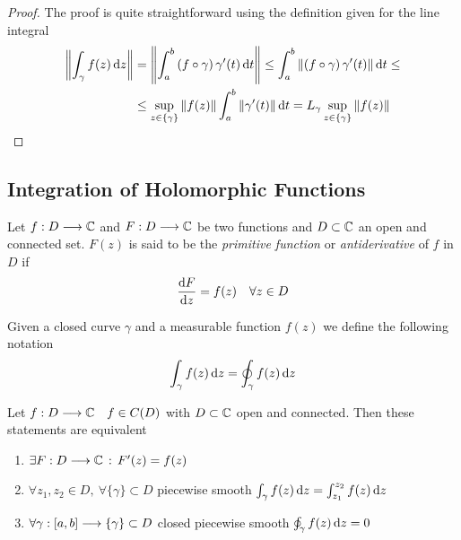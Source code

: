 \documentclass[../complete.tex]{subfiles}
\begin{document}
\begin{proof}
	The proof is quite straightforward using the definition given for the line integral
	\begin{equation*}
		\begin{aligned}
			\norm{\int_{\gamma}^{}f(z)\operatorname{d\!} z}&=\norm{\int_{a}^{b}\left( f\circ\gamma \right)\gamma'(t)\operatorname{d\!} t}\le\int_{a}^{b}\norm{\left( f\circ\gamma \right)\gamma'(t)}\operatorname{d\!} t\le\\
			&\le\sup_{z\in\{\gamma\}}\norm{f(z)}\int_{a}^{b}\norm{\gamma'(t)}\operatorname{d\!} t=L_\gamma\sup_{z\in\{\gamma\}}\norm{f(z)}
		\end{aligned}
	\end{equation*}
\end{proof}
\subsection{Integration of Holomorphic Functions}
\begin{dfn}[Primitive]
	Let $f:D\overset{}{\longrightarrow}\mathbb{C}$ and $F:D\overset{}{\longrightarrow}\mathbb{C}$ be two functions and $D\subset\mathbb{C}$ an open and connected set. $F(z)$ is said to be the \textit{primitive function} or \textit{antiderivative} of $f$ in $D$ if
	\begin{equation}
		\derivative{F}{z}=f(z)\quad\forall z\in D
		\label{eq:primitive}
	\end{equation}
\end{dfn}
\begin{ntn}
	Given a closed curve $\gamma$ and a measurable function $f(z)$ we define the following notation
	\begin{equation*}
		\int_\gamma f(z)\operatorname{d\!} z=\oint_\gamma f(z)\operatorname{d\!} z
	\end{equation*}
\end{ntn}
\begin{thm}
	Let $f:D\overset{}{\longrightarrow}\mathbb{C}\quad f\in C(D)$ with $D\subset\mathbb{C}$ open and connected. Then these statements are equivalent
	\begin{enumerate}
	\item $\exists F:D\overset{}{\longrightarrow}\mathbb{C}\, :\,  F'(z)=f(z)$
	\item $\forall z_1,z_2\in D,\ \forall\{\gamma\}\subset D$ piecewise smooth $\int_{\gamma}^{}f(z)\operatorname{d\!} z=\int_{z_1}^{z_2}f(z)\operatorname{d\!} z$
	\item $\forall\gamma:[a,b]\overset{}{\longrightarrow}\{\gamma\}\subset D$ closed piecewise smooth $\oint_\gamma f(z)\operatorname{d\!} z=0$
	\end{enumerate}
\end{thm}
\end{document}
